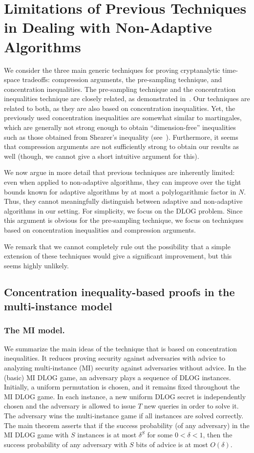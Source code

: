 \documentclass[11pt]{article}
\begin{document}
\section{Limitations of Previous Techniques in Dealing with Non-Adaptive Algorithms}
\label{app:limitations}

We consider the three main generic techniques for proving cryptanalytic time-space tradeoffs:
compression arguments, the pre-sampling technique, and concentration inequalities.  
The pre-sampling technique and the concentration inequalities technique are closely related, as demonstrated in~\cite{GuoLLZ21}. Our techniques are related to both, as they are also based on concentration inequalities. Yet, the previously used concentration inequalities are somewhat similar to martingales, which are generally not strong enough to obtain ``dimension-free'' inequalities such as those obtained from Shearer's inequality (see~\cite[Section 4]{Vondr10}). 
Furthermore, it seems that compression arguments are not sufficiently strong to obtain our results as well (though, we cannot give a short intuitive argument for this). 

We now argue in more detail that previous techniques are inherently limited: even when applied to non-adaptive algorithms, they can improve over the tight bounds known for adaptive algorithms by at most a polylogarithmic factor in $N$. Thus, they cannot meaningfully distinguish between adaptive and non-adaptive algorithms in our setting. For simplicity, we focus on the DLOG problem.
Since this argument is obvious for the pre-sampling technique,
we focus on techniques 
based on 
concentration inequalities and compression arguments.

We remark that we cannot completely rule out the possibility that 
a simple extension of these techniques would give a significant improvement,
but this seems highly unlikely.

\subsection{Concentration inequality-based proofs in the multi-instance model}

\subsubsection*{The MI model.} We summarize the main ideas of the technique that is based on concentration inequalities.
It reduces proving security against adversaries with advice to analyzing multi-instance (MI) security against adversaries without advice.
In the (basic) MI DLOG game, an adversary plays a sequence of DLOG instances.
Initially, a uniform permutation is chosen, and it remains fixed throughout the MI DLOG game.
In each instance, a new uniform DLOG secret is independently chosen and the adversary is allowed to issue $T$ new queries
in order to solve it. The adversary wins the multi-instance game if all instances are solved correctly.
The main theorem asserts that if the success probability (of any adversary) in 
the MI DLOG game with $S$ instances is at most $\delta^{S}$ for some $0 < \delta < 1$,
then the success probability of any adversary with $S$ bits of advice is at most $O(\delta)$.
\end{document}
